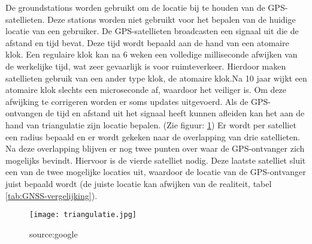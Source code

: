 De groundstations worden gebruikt om de locatie bij te houden van de GPS-satellieten. Deze stations worden niet gebruikt voor het bepalen van de huidige locatie van een gebruiker. 
\newline
\newline
De GPS-satellieten broadcasten een signaal uit die de afstand en tijd bevat. Deze tijd wordt bepaald aan de hand van een atomaire klok. Een regulaire klok kan na 6 weken een volledige milliseconde afwijken van de werkelijke tijd, wat zeer gevaarlijk is voor ruimteverkeer. Hierdoor maken satellieten gebruik van een ander type klok, de atomaire klok.Na 10 jaar wijkt een atomaire klok slechts een microseconde af, waardoor het veiliger is. Om deze afwijking te corrigeren worden er soms updates uitgevoerd. \autocite{atomic_clock}
\newline
Als de GPS-ontvangen de tijd en afstand uit het signaal heeft kunnen afleiden kan het aan de hand van triangulatie zijn locatie bepalen. (Zie figuur: \ref{fig:triangulatie})
Er wordt per satelliet een radius bepaald en er wordt gekeken naar de overlapping van drie satellieten. Na deze overlapping blijven er nog twee punten over waar de GPS-ontvanger zich mogelijks bevindt. Hiervoor is de vierde satelliet nodig. Deze laatste satelliet sluit een van de twee mogelijke locaties uit, waardoor de locatie van de GPS-ontvanger juist bepaald wordt (de juiste locatie kan afwijken van de realiteit, tabel \ref{tab:GNSS-vergelijking}). 

\begin{figure}
	\texttt{[image: triangulatie.jpg]}
	\caption{source:google}
	\label{fig:triangulatie}
\end{figure} 
\pagebreak
